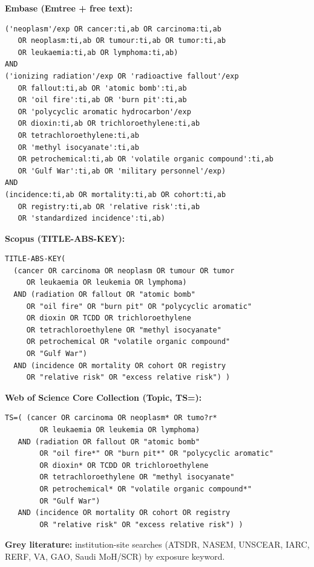 \documentclass[3p,times]{elsarticle}
\begin{document}
\textbf{Embase (Emtree + free text):}
{\footnotesize
\begin{verbatim}
('neoplasm'/exp OR cancer:ti,ab OR carcinoma:ti,ab
   OR neoplasm:ti,ab OR tumour:ti,ab OR tumor:ti,ab
   OR leukaemia:ti,ab OR lymphoma:ti,ab)
AND
('ionizing radiation'/exp OR 'radioactive fallout'/exp
   OR fallout:ti,ab OR 'atomic bomb':ti,ab
   OR 'oil fire':ti,ab OR 'burn pit':ti,ab
   OR 'polycyclic aromatic hydrocarbon'/exp
   OR dioxin:ti,ab OR trichloroethylene:ti,ab
   OR tetrachloroethylene:ti,ab
   OR 'methyl isocyanate':ti,ab
   OR petrochemical:ti,ab OR 'volatile organic compound':ti,ab
   OR 'Gulf War':ti,ab OR 'military personnel'/exp)
AND
(incidence:ti,ab OR mortality:ti,ab OR cohort:ti,ab
   OR registry:ti,ab OR 'relative risk':ti,ab
   OR 'standardized incidence':ti,ab)
\end{verbatim}
}

\textbf{Scopus (TITLE-ABS-KEY):}
{\footnotesize
\begin{verbatim}
TITLE-ABS-KEY(
  (cancer OR carcinoma OR neoplasm OR tumour OR tumor
     OR leukaemia OR leukemia OR lymphoma)
  AND (radiation OR fallout OR "atomic bomb"
     OR "oil fire" OR "burn pit" OR "polycyclic aromatic"
     OR dioxin OR TCDD OR trichloroethylene
     OR tetrachloroethylene OR "methyl isocyanate"
     OR petrochemical OR "volatile organic compound"
     OR "Gulf War")
  AND (incidence OR mortality OR cohort OR registry
     OR "relative risk" OR "excess relative risk") )
\end{verbatim}
}

\textbf{Web of Science Core Collection (Topic, TS=):}
{\footnotesize
\begin{verbatim}
TS=( (cancer OR carcinoma OR neoplasm* OR tumo?r*
        OR leukaemia OR leukemia OR lymphoma)
   AND (radiation OR fallout OR "atomic bomb"
        OR "oil fire*" OR "burn pit*" OR "polycyclic aromatic"
        OR dioxin* OR TCDD OR trichloroethylene
        OR tetrachloroethylene OR "methyl isocyanate"
        OR petrochemical* OR "volatile organic compound*"
        OR "Gulf War")
   AND (incidence OR mortality OR cohort OR registry
        OR "relative risk" OR "excess relative risk") )
\end{verbatim}
}

\textbf{Grey literature:} institution-site searches (ATSDR, NASEM, UNSCEAR, IARC, RERF, VA, GAO, Saudi MoH/SCR) by exposure keyword.
\end{document}
